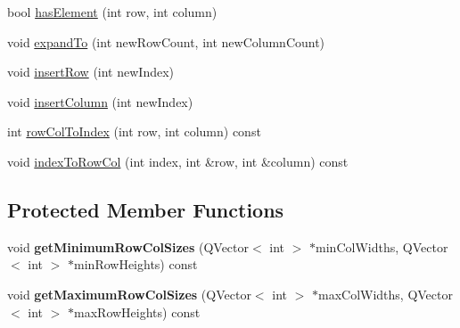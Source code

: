 \begin{DoxyCompactItemize}
\item 
bool \hyperlink{classQCPLayoutGrid_ab0cf4f7edc9414a3bfaddac0f46dc0a0}{has\+Element} (int row, int column)
\item 
void \hyperlink{classQCPLayoutGrid_a886c0dcbabd51a45da399e044552b685}{expand\+To} (int new\+Row\+Count, int new\+Column\+Count)
\item 
void \hyperlink{classQCPLayoutGrid_a48af3dd7c3a653d9c3d7dd99bd02e838}{insert\+Row} (int new\+Index)
\item 
void \hyperlink{classQCPLayoutGrid_a1e880a321dbe8b43b471ccd764433dc4}{insert\+Column} (int new\+Index)
\item 
int \hyperlink{classQCPLayoutGrid_a3cefc5fe391722b653958ab6e984c706}{row\+Col\+To\+Index} (int row, int column) const 
\item 
void \hyperlink{classQCPLayoutGrid_a964d4e6284af1cfc4da0292c2e0b5ac0}{index\+To\+Row\+Col} (int index, int \&row, int \&column) const 
\end{DoxyCompactItemize}
\subsection*{Protected Member Functions}
\begin{DoxyCompactItemize}
\item 
void {\bfseries get\+Minimum\+Row\+Col\+Sizes} (Q\+Vector$<$ int $>$ $\ast$min\+Col\+Widths, Q\+Vector$<$ int $>$ $\ast$min\+Row\+Heights) const \hypertarget{classQCPLayoutGrid_ac645fb9b1c4257b08a9f09dee10b9b3f}{}\label{classQCPLayoutGrid_ac645fb9b1c4257b08a9f09dee10b9b3f}

\item 
void {\bfseries get\+Maximum\+Row\+Col\+Sizes} (Q\+Vector$<$ int $>$ $\ast$max\+Col\+Widths, Q\+Vector$<$ int $>$ $\ast$max\+Row\+Heights) const \hypertarget{classQCPLayoutGrid_af348d903e3b8bc416f1fe1b8125d1173}{}\label{classQCPLayoutGrid_af348d903e3b8bc416f1fe1b8125d1173}

\end{DoxyCompactItemize}
